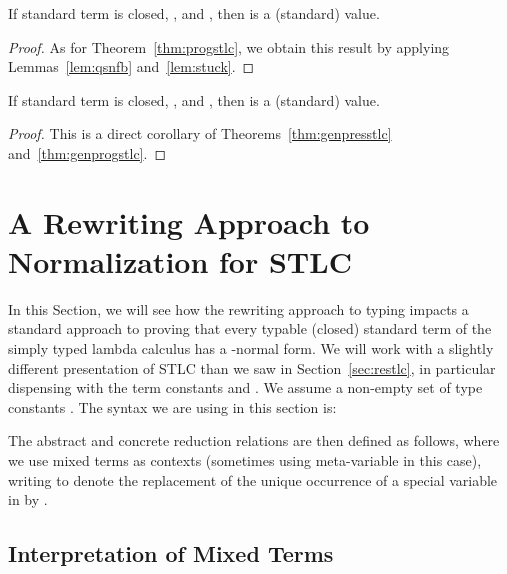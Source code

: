 \documentclass{LMCS}
\begin{document}
\begin{thm}
\label{thm:genprogstlc}
If standard term  is closed, , and ,
then  is a (standard) value.
\end{thm}

\begin{proof} As for Theorem~\ref{thm:progstlc}, we obtain
this result by applying Lemmas~\ref{lem:qsnfb} and~\ref{lem:stuck}. 
\end{proof}

\begin{thm}
\label{thm:gensafety}
If standard term  is closed, , and , then  is a (standard) value.
\end{thm}
\begin{proof} This is a direct corollary of
Theorems~\ref{thm:genpresstlc} and~\ref{thm:genprogstlc}. \end{proof}

\section{A Rewriting Approach to Normalization for STLC}
\label{sec:normstlc}

In this Section, we will see how the rewriting approach to typing
impacts a standard approach to proving that every typable (closed)
standard term of the simply typed lambda calculus has a -normal
form.  We will work with a slightly different presentation of STLC
than we saw in Section~\ref{sec:restlc}, in particular dispensing with
the term constants  and .  We assume a non-empty set of type
constants .  The syntax we are using in this section is:



\noindent The abstract and concrete reduction relations are then
defined as follows, where we use mixed terms  as contexts
(sometimes using meta-variable  in this case), writing
 to denote the replacement of the unique occurrence of a
special variable  in  by .  



\subsection{Interpretation of Mixed Terms}
\label{sec:interp}
\end{document}
